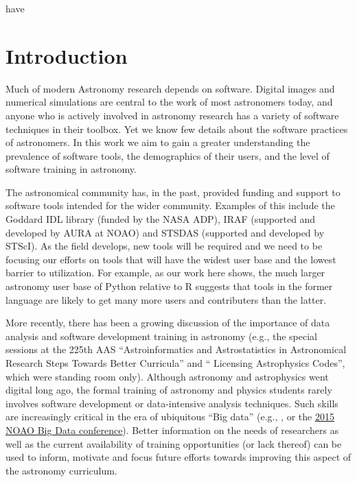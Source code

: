 have \section{Introduction}
\label{sec:intro}

Much of modern Astronomy research depends on software. Digital images and numerical simulations are central to the work of most astronomers today, and anyone who is actively involved in astronomy research has a variety of software techniques in their toolbox. Yet we know few details about the software practices of astronomers. In this work we aim to gain a greater understanding the prevalence of software tools, the demographics of their users, and the level of software training in astronomy.

The astronomical community has, in the past, provided funding and support to software tools intended for the wider community. Examples of this include the Goddard IDL library (funded by the NASA ADP), IRAF (supported and developed by AURA at NOAO) and STSDAS (supported and developed by STScI). As the field develops, new tools will be required and we need to be focusing our efforts on tools that will have the widest user base and the lowest barrier to utilization. For example, as our work here shows, the much larger astronomy user base of Python relative to R suggests that tools in the former language are likely to get many more users and contributers than the latter. 

More recently, there has been a growing discussion of the importance of data analysis and software development training in astronomy (e.g., the special sessions at the 225th AAS ``Astroinformatics and Astrostatistics in Astronomical Research Steps Towards Better Curricula'' and `` Licensing Astrophysics Codes'', which were standing room only). Although astronomy and astrophysics went digital long ago, the formal training of astronomy and physics students rarely involves software development or data-intensive analysis techniques. Such skills are increasingly critical in the era of ubiquitous ``Big data'' (e.g., \citet{Berriman_2011}, or the \href{http://www.noao.edu/meetings/bigdata/}{2015 NOAO Big Data conference}). Better information on the needs of researchers as well as the current availability of training opportunities (or lack thereof) can be used to inform, motivate and focus future efforts towards improving this aspect of the astronomy curriculum. 

